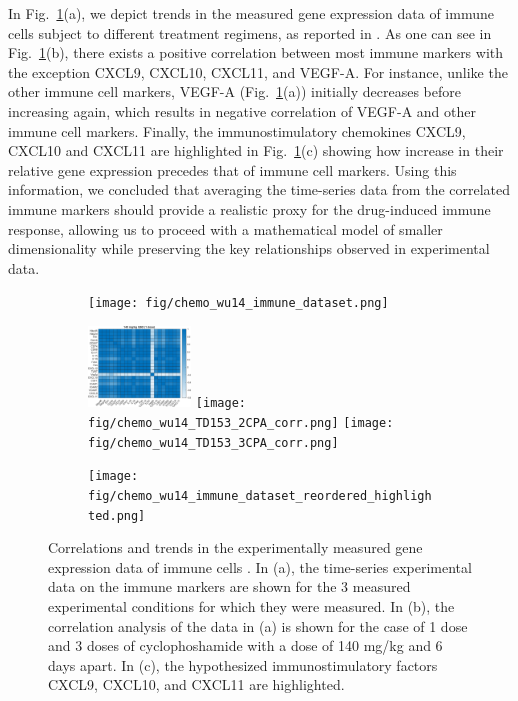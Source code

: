 In Fig.~\ref{fig:immune_data}(a), we depict trends in the measured gene expression data of immune cells subject to different treatment regimens, as reported in \cite{wu2014metronomic}. As one can see in Fig.~\ref{fig:immune_data}(b), there exists a positive correlation between most immune markers with the exception CXCL9, CXCL10, CXCL11, and VEGF-A. For instance, unlike the other immune cell markers, VEGF-A (Fig.~\ref{fig:immune_data}(a)) initially decreases before increasing again, which results in negative correlation of VEGF-A and other immune cell markers. Finally, the immunostimulatory chemokines CXCL9, CXCL10 and CXCL11 are highlighted in Fig.~\ref{fig:immune_data}(c) showing how increase in their relative gene expression precedes that of immune cell markers. Using this information, we concluded that averaging the time-series data from the correlated immune markers should provide a realistic proxy for the drug-induced immune response, allowing us to proceed with a mathematical model of smaller dimensionality while preserving the key relationships observed in experimental data.

\begin{figure}
	\centering
	\begin{subfigure}[b]{\textwidth}
		\centering
		\texttt{[image: fig/chemo\_wu14\_immune\_dataset.png]}
		\caption{}
	\end{subfigure}
	\begin{subfigure}[b]{\textwidth}
		\centering
		\includegraphics[width=0.3\textwidth]{fig/chemo_wu14_TD153_1CPA_corr.png}
		\texttt{[image: fig/chemo\_wu14\_TD153\_2CPA\_corr.png]}
		\texttt{[image: fig/chemo\_wu14\_TD153\_3CPA\_corr.png]}
		\caption{}
	\end{subfigure}
	\begin{subfigure}[b]{0.9\textwidth}
		\centering
		\texttt{[image: fig/chemo\_wu14\_immune\_dataset\_reordered\_highlighted.png]}
		\caption{}
	\end{subfigure}
	\caption[Immune cell markers]{Correlations and trends in the experimentally measured gene expression data of immune cells \cite{wu2014metronomic}. In (a), the time-series experimental data on the immune markers are shown for the 3 measured experimental conditions for which they were measured. In (b), the correlation analysis of the data in (a) is shown for the case of 1 dose and 3 doses of cyclophoshamide with a dose of 140 mg/kg and 6 days apart. In (c), the hypothesized immunostimulatory factors CXCL9, CXCL10, and CXCL11 are highlighted.}
	\label{fig:immune_data}
\end{figure}